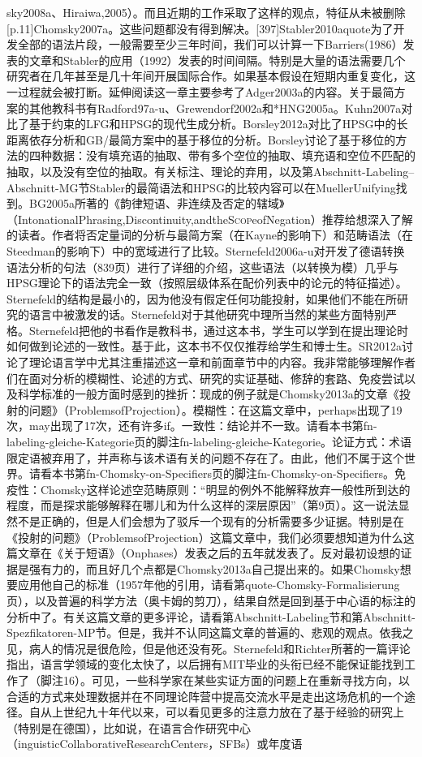 sky2008a、Hiraiwa,2005）。而且近期的工作采取了这样的观点，特征从未被删除[p.11]Chomsky2007a。这些问题都没有得到解决。[397]Stabler2010aquote为了开发全部的语法片段，一般需要至少三年时间，我们可以计算一下Barriers(1986）发表的文章和Stabler的应用（1992）发表的时间间隔。特别是大量的语法需要几个研究者在几年甚至是几十年间开展国际合作。如果基本假设在短期内重复变化，这一过程就会被打断。延伸阅读这一章主要参考了Adger2003a的内容。关于最简方案的其他教科书有Radford97a-u、Grewendorf2002a和*HNG2005a。Kuhn2007a对比了基于约束的LFG和HPSG的现代生成分析。Borsley2012a对比了HPSG中的长距离依存分析和GB/最简方案中的基于移位的分析。Borsley讨论了基于移位的方法的四种数据：没有填充语的抽取、带有多个空位的抽取、填充语和空位不匹配的抽取，以及没有空位的抽取。有关标注、理论的弃用，以及第Abschnitt-Labeling--Abschnitt-MG节Stabler的最简语法和HPSG的比较内容可以在MuellerUnifying找到。BG2005a所著的《韵律短语、非连续及否定的辖域》（IntonationalPhrasing,Discontinuity,andtheS\textsc{cop}eofNegation）推荐给想深入了解的读者。作者将否定量词的分析与最简方案（在Kayne的影响下）和范畴语法（在Steedman的影响下）中的宽域进行了比较。Sternefeld2006a-u对开发了德语转换语法分析的句法（839页）进行了详细的介绍，这些语法（以转换为模）几乎与HPSG理论下的语法完全一致（按照层级体系在配价列表中的论元的特征描述）。Sternefeld的结构是最小的，因为他没有假定任何功能投射，如果他们不能在所研究的语言中被激发的话。Sternefeld对于其他研究中理所当然的某些方面特别严格。Sternefeld把他的书看作是教科书，通过这本书，学生可以学到在提出理论时如何做到论述的一致性。基于此，这本书不仅仅推荐给学生和博士生。SR2012a讨论了理论语言学中尤其注重描述这一章和前面章节中的内容。我非常能够理解作者们在面对分析的模糊性、论述的方式、研究的实证基础、修辞的套路、免疫尝试以及科学标准的一般方面时感到的挫折：现成的例子就是Chomsky2013a的文章《投射的问题》（ProblemsofProjection）。模糊性：在这篇文章中，perhaps出现了19次，may出现了17次，还有许多if。一致性：结论并不一致。请看本书第fn-labeling-gleiche-Kategorie页的脚注fn-labeling-gleiche-Kategorie。论证方式：术语限定语被弃用了，并声称与该术语有关的问题不存在了。由此，他们不属于这个世界。请看本书第fn-Chomsky-on-Specifiers页的脚注fn-Chomsky-on-Specifiers。免疫性：Chomsky这样论述空范畴原则：“明显的例外不能解释放弃一般性所到达的程度，而是探求能够解释在哪儿和为什么这样的深层原因”（第9页）。这一说法显然不是正确的，但是人们会想为了驳斥一个现有的分析需要多少证据。特别是在《投射的问题》（ProblemsofProjection）这篇文章中，我们必须要想知道为什么这篇文章在《关于短语》（Onphases）发表之后的五年就发表了。反对最初设想的证据是强有力的，而且好几个点都是Chomsky2013a自己提出来的。如果Chomsky想要应用他自己的标准（1957年他的引用，请看第quote-Chomsky-Formalisierung页），以及普遍的科学方法（奥卡姆的剪刀），结果自然是回到基于中心语的标注的分析中了。有关这篇文章的更多评论，请看第Abschnitt-Labeling节和第Abschnitt-Spezfikatoren-MP节。但是，我并不认同这篇文章的普遍的、悲观的观点。依我之见，病人的情况是很危险，但是他还没有死。Sternefeld和Richter所著的一篇评论指出，语言学领域的变化太快了，以后拥有MIT毕业的头衔已经不能保证能找到工作了（脚注16）。可见，一些科学家在某些实证方面的问题上在重新寻找方向，以合适的方式来处理数据并在不同理论阵营中提高交流水平是走出这场危机的一个途径。自从上世纪九十年代以来，可以看见更多的注意力放在了基于经验的研究上（特别是在德国），比如说，在语言合作研究中心（inguisticCollaborativeResearchCenters，SFBs）或年度语